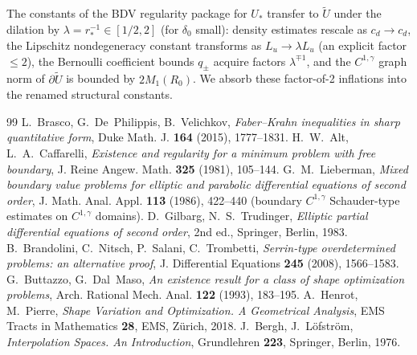 \documentclass[11pt]{amsart}
\newcommand{\wt}{\widetilde}
\begin{document}
The constants of the BDV regularity package for \(U_*\) transfer to
\(\wt U\) under the dilation by \(\lambda=r_*^{-1}\in[1/2,2]\) (for
\(\delta_0\) small): density estimates rescale as \(c_d\to c_d\), the
Lipschitz nondegeneracy constant transforms as \(L_u\to\lambda L_u\)
(an explicit factor \(\le 2\)), the Bernoulli coefficient bounds
\(q_\pm\) acquire factors \(\lambda^{\mp 1}\), and the
\(C^{1,\gamma}\) graph norm of \(\partial\wt U\) is bounded by
\(2M_1(R_0)\).  We absorb these factor-of-2 inflations into the
renamed structural constants.

\begin{thebibliography}{99}
 L.~Brasco, G.~De~Philippis, B.~Velichkov,
\emph{Faber--Krahn inequalities in sharp quantitative form},
Duke Math. J. \textbf{164} (2015), 1777--1831.
 H.~W.~Alt, L.~A.~Caffarelli,
\emph{Existence and regularity for a minimum problem with free
boundary}, J. Reine Angew. Math. \textbf{325} (1981), 105--144.
 G.~M.~Lieberman,
\emph{Mixed boundary value problems for elliptic and parabolic
differential equations of second order},
J. Math. Anal. Appl. \textbf{113} (1986), 422--440 (boundary
$C^{1,\gamma}$ Schauder-type estimates on $C^{1,\gamma}$ domains).
 D.~Gilbarg, N.~S.~Trudinger,
\emph{Elliptic partial differential equations of second order},
2nd ed., Springer, Berlin, 1983.
 B.~Brandolini, C.~Nitsch, P.~Salani, C.~Trombetti,
\emph{Serrin-type overdetermined problems: an alternative proof},
J. Differential Equations \textbf{245} (2008), 1566--1583.
 G.~Buttazzo, G.~Dal~Maso,
\emph{An existence result for a class of shape optimization problems},
Arch. Rational Mech. Anal. \textbf{122} (1993), 183--195.
 A.~Henrot, M.~Pierre,
\emph{Shape Variation and Optimization. A Geometrical Analysis},
EMS Tracts in Mathematics \textbf{28}, EMS, Z\"urich, 2018.
 J.~Bergh, J.~L\"ofstr\"om,
\emph{Interpolation Spaces. An Introduction},
Grundlehren \textbf{223}, Springer, Berlin, 1976.
\end{thebibliography}
\end{document}

